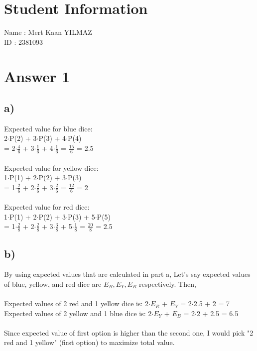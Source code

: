 \documentclass[12pt]{article}
\begin{document}
\section*{Student Information}

Name : Mert Kaan YILMAZ\\

ID : 2381093\\


\section*{Answer 1}
\subsection*{a)}\noindent 
Expected value for blue dice:\\
2$\cdot$P(2) + 3$\cdot$P(3) + 4$\cdot$P(4)\\
= 2$\cdot\frac{4}{6}$ + 3$\cdot\frac{1}{6}$ + 4$\cdot\frac{1}{6}$ = $\frac{15}{6}$ = 2.5\\\\
Expected value for yellow dice:\\
1$\cdot$P(1) + 2$\cdot$P(2) + 3$\cdot$P(3)\\
= 1$\cdot\frac{2}{6}$ + 2$\cdot\frac{2}{6}$ + 3$\cdot\frac{2}{6}$ = $\frac{12}{6}$ = 2\\\\
Expected value for red dice:\\
1$\cdot$P(1) + 2$\cdot$P(2) + 3$\cdot$P(3) + 5$\cdot$P(5)\\
= 1$\cdot\frac{2}{8}$ + 2$\cdot\frac{2}{8}$ + 3$\cdot\frac{3}{8}$ + 5$\cdot\frac{1}{8}$ = $\frac{20}{8}$ = 2.5\\
\subsection*{b)}\noindent 
By using expected values that are calculated in part a, Let's say expected values of blue, yellow, and red dice are $E_B, E_Y, E_R$ respectively. Then,\\\\
Expected values of 2 red and 1 yellow dice is: 2$\cdot E_R$ + $E_Y$ = 2$\cdot$2.5 + 2 = 7\\
Expected values of 2 yellow and 1 blue dice is: 2$\cdot E_Y$ + $E_B$ = 2$\cdot$2 + 2.5 = 6.5\\\\
Since expected value of first option is higher than the second one, I would pick "2 red and 1 yellow" (first option) to maximize total value.
\end{document}
